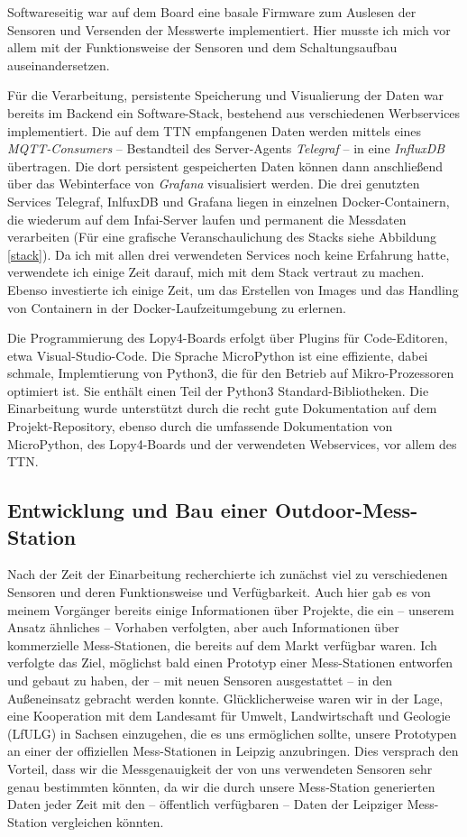 \documentclass[a4paper,11pt]{article}
\begin{document}
Softwareseitig war auf dem Board eine basale Firmware zum Auslesen der
Sensoren und Versenden der Messwerte implementiert. Hier musste ich mich vor
allem mit der Funktionsweise der Sensoren und dem Schaltungsaufbau
auseinandersetzen.

Für die Verarbeitung, persistente Speicherung und Visualierung der Daten war
bereits im Backend ein Software-Stack, bestehend aus verschiedenen
Werbservices implementiert. Die auf dem TTN empfangenen Daten werden mittels
eines \textit{MQTT-Consumers} -- Bestandteil des Server-Agents
\textit{Telegraf} -- in eine \textit{InfluxDB} übertragen. Die dort persistent
gespeicherten Daten können dann anschließend über das Webinterface von
\textit{Grafana} visualisiert werden. Die drei genutzten Services Telegraf,
InlfuxDB und Grafana liegen in einzelnen Docker-Containern, die wiederum auf
dem Infai-Server laufen und permanent die Messdaten verarbeiten (Für eine
grafische Veranschaulichung des Stacks siehe Abbildung \ref{stack}). Da ich
mit allen drei verwendeten Services noch keine Erfahrung hatte, verwendete ich
einige Zeit darauf, mich mit dem Stack vertraut zu machen. Ebenso investierte
ich einige Zeit, um das Erstellen von Images und das Handling von Containern
in der Docker-Laufzeitumgebung zu erlernen.

Die Programmierung des Lopy4-Boards erfolgt über Plugins für Code-Editoren,
etwa Visual-Studio-Code. Die Sprache MicroPython ist eine effiziente, dabei
schmale, Implemtierung von Python3, die für den Betrieb auf Mikro-Prozessoren
optimiert ist. Sie enthält einen Teil der Python3 Standard-Bibliotheken.  Die
Einarbeitung wurde unterstützt durch die recht gute Dokumentation auf dem
Projekt-Repository, ebenso durch die umfassende Dokumentation von
MicroPython, des Lopy4-Boards und der verwendeten Webservices, vor allem des
TTN.

\subsection{Entwicklung und Bau einer Outdoor-Mess-Station}

Nach der Zeit der Einarbeitung recherchierte ich zunächst viel zu
verschiedenen Sensoren und deren Funktionsweise und Verfügbarkeit. Auch hier
gab es von meinem Vorgänger bereits einige Informationen über Projekte, die
ein -- unserem Ansatz ähnliches -- Vorhaben verfolgten, aber auch
Informationen über kommerzielle Mess-Stationen, die bereits auf dem Markt
verfügbar waren. Ich verfolgte das Ziel, möglichst bald einen Prototyp einer
Mess-Stationen entworfen und gebaut zu haben, der -- mit neuen Sensoren
ausgestattet -- in den Außeneinsatz gebracht werden konnte. Glücklicherweise
waren wir in der Lage, eine Kooperation mit dem Landesamt für Umwelt,
Landwirtschaft und Geologie (LfULG) in Sachsen einzugehen, die es uns
ermöglichen sollte, unsere Prototypen an einer der offiziellen Mess-Stationen
in Leipzig anzubringen. Dies versprach den Vorteil, dass wir die
Messgenauigkeit der von uns verwendeten Sensoren sehr genau bestimmten
könnten, da wir die durch unsere Mess-Station generierten Daten jeder Zeit mit
den -- öffentlich verfügbaren -- Daten der Leipziger Mess-Station vergleichen
könnten.
\end{document}
